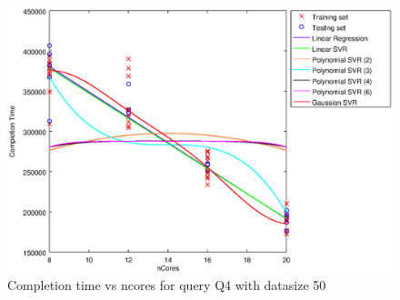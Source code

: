 
\begin {figure}[hbtp]
\centering
\includegraphics[width=\textwidth]{output/Q4_50_ONLY_NCORES/plot_Q4_50.eps}
\caption{Completion time vs ncores for query Q4 with datasize 50}
\label{fig:all_linear_Q4_50}
\end {figure}
